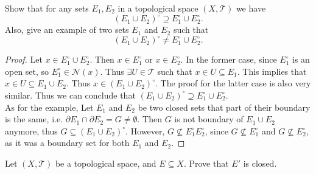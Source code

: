 \begin{problem}
	Show that for any sets $E_1, E_2$ in a topological space $(X,\mathcal{T})$ we have
	\[ (E_1 \cup E_2)^\circ \supseteq E_1^\circ \cup E_2^\circ. \]
	Also, give an example of two sets $E_1$ and $E_2$ such that 
	\[ (E_1 \cup E_2)^\circ \neq E_1^\circ \cup E_2^\circ. \]
\end{problem}
\begin{proof}
	Let $x \in E_1^\circ \cup E_2^\circ$. Then $x \in E_1^\circ$ or $x \in E_2^\circ$. In the former case, since $E_1^\circ$ is an open set, so $E_1^\circ \in \mathcal{N}(x)$. Thus $\exists U \in \mathcal{T}$ such that $x \in U \subseteq E_1$. This implies that $x\in U \subseteq E_1 \cup E_2$. Thus $x \in (E_1\cup E_2)^\circ.$ The proof for the latter case is also very similar. Thus we can conclude that $(E_1 \cup E_2)^\circ \supseteq E_1^\circ \cup E_2^\circ$. \\
	As for the example, Let $E_1$ and $E_2$ be two closed sets that part of their boundary is the same, i.e. $\partial E_1 \cap \partial E_2 = G \neq \emptyset$. Then $G$ is not boundary of $E_1 \cup E_2$ anymore, thus $G \subseteq (E_1 \cup E_2)^\circ$. However, $G \not\subseteq E_1^\circ E_2^\circ$, since $G \not\subseteq E_1^\circ$ and $G \not\subseteq E_2^\circ$, as it was a boundary set for both $E_1$ and $E_2$.
\end{proof}

\begin{problem}
	Let $(X,\mathcal{T})$ be a topological space, and $E \subseteq X$. Prove that $E'$ is closed.
\end{problem}
 